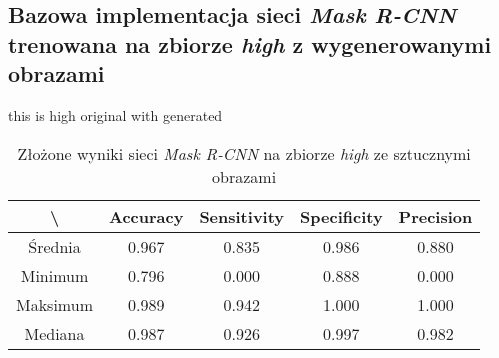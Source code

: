 \subsection{Bazowa implementacja sieci \textit{Mask R-CNN} trenowana na zbiorze \textit{high} z wygenerowanymi obrazami}
this is high original with generated

\begin{table}[H]
	\centering
	\caption{Złożone wyniki sieci \textit{Mask R-CNN} na zbiorze \textit{high} ze sztucznymi obrazami}
	\vspace{6pt}
	{\footnotesize
		\begin{tabular}{|c|c|c|c|c|}
      \hline \textbackslash & Accuracy & Sensitivity & Specificity & Precision \\
      \hline Średnia & 0.967 & 0.835 & 0.986 & 0.880 \\
      \hline Minimum & 0.796 & 0.000 & 0.888 & 0.000 \\
      \hline Maksimum & 0.989 & 0.942 & 1.000 & 1.000 \\
      \hline Mediana & 0.987 & 0.926 & 0.997 & 0.982 \\
      \hline
		\end{tabular}
	}
  \vspace{0pt}
  \label{Tab:high_original_generated_calculated}
\end{table}


